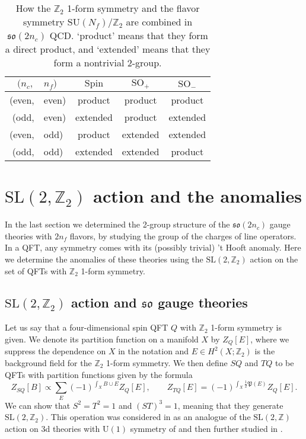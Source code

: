 \documentclass[12pt]{article}
\numberwithin{equation}{section}
\def\bZ{\mathbb{Z}}
\def\fP{\mathfrak{P}}
\def\U{\mathrm{U}}
\def\SU{\mathrm{SU}}
\def\SO{\mathrm{SO}}
\def\so{\mathfrak{so}}
\def\Spin{\mathrm{Spin}}
\def\SL{\mathrm{SL}}
\begin{document}
\begin{table}
\centering
\renewcommand{\arraystretch}{1.2}
\begin{tabular}{rl|ccc}
$(n_c,$&$n_f)$ & $\Spin$ & $\SO_+$ & $\SO_-$\\
\hline
(even,&even) & product & product & product \\
(odd,&even) & extended & product & extended \\
(even,&odd) & product & extended & extended \\
(odd,&odd) & extended & extended & product
\end{tabular}
\caption{How the $\bZ_2$ 1-form symmetry and the flavor symmetry $\SU(N_f)/\bZ_2$ are combined
in $\so(2n_c)$ QCD.
`product' means that they form a direct product,
and `extended' means that they form a nontrivial 2-group.
\label{table:2group}}
\end{table}

\section{$\SL(2,\bZ_2)$ action and the anomalies}
\label{sec:sl2z}
In the last section we determined the 2-group structure of the $\so(2n_c)$ gauge theories with $2n_f$ flavors, by studying the group of the charges of line operators. 
In a QFT, any symmetry comes with its (possibly trivial) 't Hooft anomaly.
Here we determine the anomalies of these theories using the $\SL(2,\bZ_2)$ action on the set of QFTs with $\bZ_2$ 1-form symmetry.

\subsection{$\SL(2,\bZ_2)$ action and $\so$ gauge theories}

Let us say that  a four-dimensional spin QFT $Q$ with $\bZ_2$ 1-form symmetry is given.
We denote its partition function on a manifold $X$ by $Z_Q[E]$, 
where we suppress the dependence on $X$ in the notation and $E\in H^2(X;\bZ_2)$ is the background field for the $\bZ_2$ 1-form symmetry.
We then define $SQ$ and $TQ$ to be QFTs with partition functions given by the formula \begin{equation}
Z_{SQ}[B] \propto \sum_{E} (-1)^{\int_X B\cup E} Z_Q[E],\qquad
Z_{TQ}[E]= (-1)^{\int_X \tfrac12 \fP(E)} Z_Q[E].
\end{equation}
We can show that $S^2=T^2=1$ and $(ST)^3=1$, meaning that they generate $\SL(2,\bZ_2)$.
This operation was considered in  \cite{Gaiotto:2014kfa} as an analogue of the $\SL(2,\bZ)$ action on 3d theories with $\U(1)$ symmetry of  \cite{Witten:2003ya} and then further studied in \cite{Bhardwaj:2020ymp}.
\end{document}
